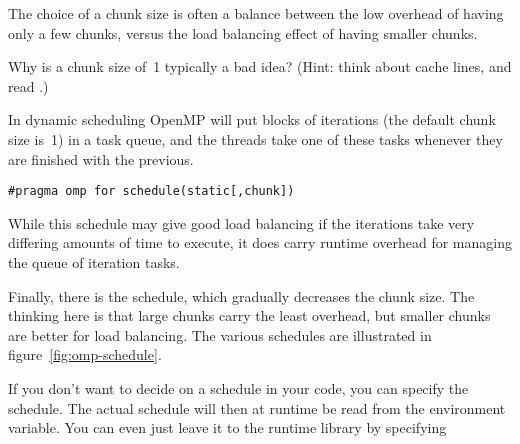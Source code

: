 The choice of a chunk size is often a balance between the low overhead of having 
only a few chunks, versus the load balancing effect of having smaller chunks.
\begin{exercise}
  Why is a chunk size of~1 typically a bad idea? (Hint: think about
  cache lines, and read .)
\end{exercise}

In dynamic scheduling OpenMP will put blocks of iterations
(the default chunk size is~1) in a task queue, and the threads take one of these
tasks whenever they are finished with the previous.
\begin{verbatim}
#pragma omp for schedule(static[,chunk])
\end{verbatim}
While this schedule may give good load balancing if the iterations
take very differing amounts of time to execute, it does carry runtime
overhead for managing the queue of iteration tasks.

Finally, there is the  schedule, which gradually decreases the chunk size.
The thinking here is that large chunks carry the least overhead, but smaller chunks are better
for load balancing.
%
The various schedules are illustrated in figure~\ref{fig:omp-schedule}.

If you don't want to decide on a schedule in your code, you can
specify the  schedule. The actual
schedule will then at runtime be read from the
 environment variable. You can even just
leave it to the runtime library by specifying


